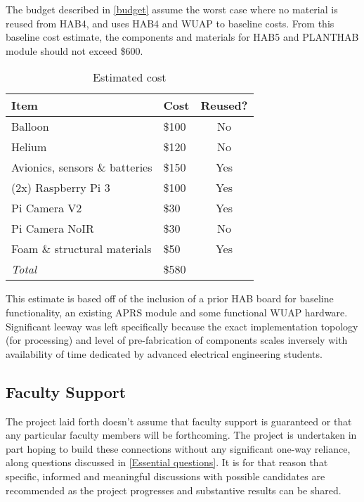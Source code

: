 \documentclass[conference]{IEEEtran} %
\begin{document}
The budget described in \autoref{budget} assume the worst case where no material is reused from HAB4, and uses HAB4 and WUAP to baseline costs.
From this baseline cost estimate, the components and materials for HAB5 and PLANTHAB module should not exceed \$600.

\begin{table}[ht]
  \caption{Estimated cost}
  \centering
  \begin{tabular}{@{}llc@{}}
    \label{budget}
    \textbf{Item} & \textbf{Cost} & \textbf{Reused?} \\
    \midrule
    Balloon & \$100 & No \\
    Helium & \$120 & No\\
    Avionics, sensors \& batteries & \$150 & Yes\\
    (2x) Raspberry Pi 3 & \$100 & Yes\\
    Pi Camera V2 & \$30 & Yes \\
    Pi Camera NoIR & \$30 & No \\
    Foam \& structural materials & \$50 & Yes \\
    \midrule
    \textit{Total} & \$580 & \\
  \end{tabular}
\end{table}

This estimate is based off of the inclusion of a prior HAB board for baseline functionality, an existing APRS module and some functional WUAP hardware.
Significant leeway was left specifically because the exact implementation topology (for processing) and level of pre-fabrication of components scales inversely with availability of time dedicated by advanced electrical engineering students.

\subsection{Faculty Support}
The project laid forth doesn't assume that faculty support is guaranteed or that any particular faculty members will be forthcoming.
The project is undertaken in part hoping to build these connections without any significant one-way reliance, along questions discussed in \autoref{Essential questions}.
It is for that reason that specific, informed and meaningful discussions with possible candidates are recommended as the project progresses and substantive results can be shared.
\end{document}
